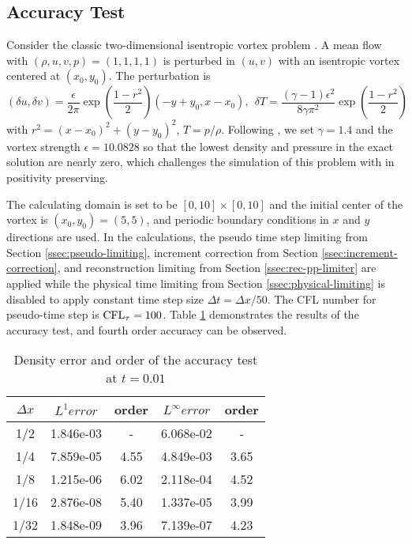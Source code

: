 \subsection{Accuracy Test}

Consider the classic two-dimensional isentropic vortex problem \cite{hu1999weighted_WENO}.
A mean flow
with $(\rho, u, v, p)=(1,1,1,1)$ is perturbed in $(u,v)$
with an isentropic vortex centered at $(x_0,y_0)$.
The perturbation is
$$
    (\delta u, \delta v) = \frac{\epsilon}{2\pi} \exp(\frac{1-r^2}{2}) (-y+y_0, x-x_0),\ \
    \delta T = \frac{(\gamma-1)\epsilon^2}{8\gamma \pi^2}\exp(\frac{1-r^2}{2})
$$
with $r^2=(x-x_0)^2+(y-y_0)^2$, $T=p/\rho$.
Following \cite{zhang2012positivity},
we set $\gamma=1.4$ and the vortex strength $\epsilon = 10.0828$ so that
the lowest density and pressure in the exact solution are nearly zero,
which challenges the simulation of this problem with in positivity preserving.

The calculating domain is set to be $[0,10]\times[0,10]$ and the initial center of
the vortex is $(x_0,y_0)=(5,5)$, and periodic boundary conditions in $x$ and $y$ directions are used.
In the calculations, the pseudo time step limiting from Section \ref{ssec:pseudo-limiting},
increment correction from Section \ref{ssec:increment-correction},
and reconstruction limiting from Section \ref{ssec:rec-pp-limiter} are applied
while the physical time limiting from Section \ref{ssec:physical-limiting}
is disabled to apply constant time step size $\Delta t = \Delta x/50$. 
The CFL number for pseudo-time step is $\text{CFL}_\tau = 100$.
Table \ref{tab:ivResults} demonstrates the results of the accuracy test, and
fourth order accuracy can be observed.

\begin{table}[htbp]
    \centering
    \footnotesize
    \begin{tabular}{|c|c|c|c|c|}
        \hline
        $\Delta x$ & $L^1 error$ & order & $L^\infty error$ & order \\
        \hline
        1/2        & 1.846e-03   & -     & 6.068e-02        & -     \\
        \hline
        1/4        & 7.859e-05   & 4.55  & 4.849e-03        & 3.65  \\
        \hline
        1/8        & 1.215e-06   & 6.02  & 2.118e-04        & 4.52  \\
        \hline
        1/16       & 2.876e-08   & 5.40  & 1.337e-05        & 3.99  \\
        \hline
        1/32       & 1.848e-09   & 3.96  & 7.139e-07        & 4.23  \\
        \hline
    \end{tabular}
    \caption{Density error and order of the accuracy test at $t=0.01$ }
    \label{tab:ivResults}
\end{table}

